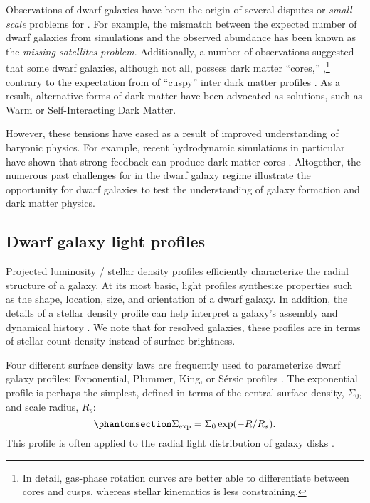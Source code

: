 Observations of dwarf galaxies have been the origin of several disputes
or \emph{small-scale} problems for \LCDM{} \citep[see reviews
by][]{bullock+boylan-kolchin2017, sales+2022}. For example, the mismatch
between the expected number of dwarf galaxies from simulations and the
observed abundance has been known as the \emph{missing satellites
problem}. Additionally, a number of observations suggested that some
dwarf galaxies, although not all, possess dark matter ``cores,''
\citep[e.g.,][]{moore1994, adams+2014, oh+2015, walker+penarrubia2011, read+walker+steger2019},\footnote{In
  detail, gas-phase rotation curves are better able to differentiate
  between cores and cusps, whereas stellar kinematics is less
  constraining.} contrary to the expectation from \LCDM{} of ``cuspy''
inter dark matter profiles \citep{NFW1996, NFW1997}. As a result,
alternative forms of dark matter have been advocated as solutions, such
as Warm or Self-Interacting Dark Matter.

However, these tensions have eased as a result of improved understanding
of baryonic physics. For example, recent hydrodynamic simulations in
particular have shown that strong feedback can produce dark matter cores
\citetext{\citealp[e.g.,][\citet{tollet+2016}]{navarro+eke+frenk1996}; \citealp{fitts+2017}; \citealp{benitez-llambay+2019}; \citealp{orkney+2021}}.
Altogether, the numerous past challenges for \LCDM{} in the dwarf galaxy
regime illustrate the opportunity for dwarf galaxies to test the
understanding of galaxy formation and dark matter physics.

\subsection{Dwarf galaxy light profiles}\label{sec:exponential_profiles}

Projected luminosity / stellar density profiles efficiently characterize
the radial structure of a galaxy. At its most basic, light profiles
synthesize properties such as the shape, location, size, and orientation
of a dwarf galaxy. In addition, the details of a stellar density profile
can help interpret a galaxy's assembly and dynamical history
\citep[e.g.,][]{penarrubia+2009, lee+2018, querci+2025}. We note that
for resolved galaxies, these profiles are in terms of stellar count
density instead of surface brightness.

Four different surface density laws are frequently used to parameterize
dwarf galaxy profiles: Exponential, Plummer, King, or Sérsic profiles
\citep[e.g.,][]{munoz+2018}. The exponential profile is perhaps the
simplest, defined in terms of the central surface density, \(\Sigma_0\),
and scale radius, \(R_s\):
\begin{equation}\protect\phantomsection\label{eq:exponential_law}{
\Sigma_{\rm exp} = \Sigma_0\exp(-R / R_s).
}\end{equation} This profile is often applied to the radial light
distribution of galaxy disks
\citep{devaucouleurs1959a, freeman1970, kent1985}.

